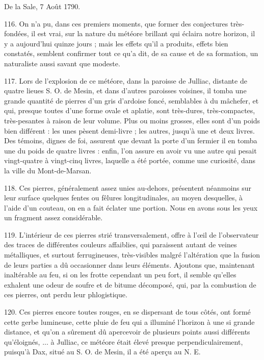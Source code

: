 \documentclass[a4paper, 11pt, oneside, polutonikogreek, french]{article}
\begin{document}
\begin{center}
De la Sale, 7 Août 1790.
\end{center}

116. On n'a pu, dans ces premiers moments, que former des conjectures très-fondées, il est vrai, sur la nature du météore brillant qui éclaira notre horizon, il y a aujourd'hui quinze jours ; mais les effets qu'il a produits, effets bien constatés, semblent confirmer tout ce qu'a dit, de sa cause et de sa formation, un naturaliste aussi savant que modeste.

117. Lors de l'explosion de ce météore, dans la paroisse de Julliac, distante de quatre lieues S. O. de Mesin, et dans d'autres paroisses voisines, il tomba une grande quantité de pierres d'un gris d'ardoise foncé, semblables à du mâchefer, et qui, presque toutes d'une forme ovale et aplatie, sont très-dures, très-compactes, très-pesantes à raison de leur volume. Plus ou moins grosses, elles sont d'un poids bien différent : les unes pèsent demi-livre ; les autres, jusqu'à une et deux livres. Des témoins, dignes de foi, assurent que devant la porte d'un fermier il en tomba une du poids de quatre livres : enfin, l'on assure en avoir vu une autre qui pesait vingt-quatre à vingt-cinq livres, laquelle a été portée, comme une curiosité, dans la ville du Mont-de-Marsan.

118. Ces pierres, généralement assez unies au-dehors, présentent néanmoins sur leur surface quelques fentes ou fêlures longitudinales, au moyen desquelles, à l'aide d'un couteau, on en a fait éclater une portion. Nous en avons sous les yeux un fragment assez considérable.

119. L'intérieur de ces pierres strié transversalement, offre à l'œil de l'observateur des traces de différentes couleurs affaiblies, qui paraissent autant de veines métalliques, et surtout ferrugineuses, très-visibles malgré l'altération que la fusion de leurs parties a dû occasionner dans leurs éléments. Ajoutons que, maintenant inaltérable au feu, si on les frotte cependant un peu fort, il semble qu'elles exhalent une odeur de soufre et de bitume décomposé, qui, par la combustion de ces pierres, ont perdu leur phlogistique.

120. Ces pierres encore toutes rouges, en se dispersant de tous côtés, ont formé cette gerbe lumineuse, cette pluie de feu qui a illuminé l'horizon à une si grande distance, et qu'on a sûrement dû apercevoir de plusieurs points aussi différents qu'éloignés, ... à Julliac, ce météore était élevé presque perpendiculairement, puisqu'à Dax, situé au S. O. de Mesin, il a été aperçu au N. E.
\end{document}

